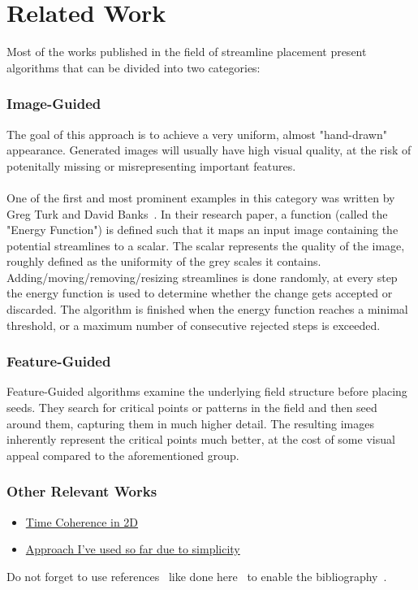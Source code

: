 \chapter{Related Work}
\label{sec:relatedWork}

Most of the works published in the field of streamline placement present algorithms that can be divided into two categories:
\subsection{Image-Guided}
The goal of this approach is to achieve a very uniform, almost "hand-drawn" appearance.
Generated images will usually have high visual quality, at the risk of potenitally missing or misrepresenting important features.
\\\\
One of the first and most prominent examples in this category was written by Greg Turk and David Banks~\cite{TurkBanks}.
In their research paper, a function (called the "Energy Function") is defined such that it maps an input image containing the potential streamlines to a scalar.
The scalar represents the quality of the image, roughly defined as the uniformity of the grey scales it contains. 
Adding/moving/removing/resizing streamlines is done randomly, at every step the energy function is used to determine whether the change gets accepted or discarded.
The algorithm is finished when the energy function reaches a minimal threshold, or a maximum number of consecutive rejected steps is exceeded.


\subsection{Feature-Guided}
Feature-Guided algorithms examine the underlying field structure before placing seeds.
They search for critical points or patterns in the field and then seed around them, capturing them in much higher detail.
The resulting images inherently represent the critical points much better, at the cost of some visual appeal compared to the aforementioned group.
\bigskip

\begin{center}
    
\end{center}


\subsection{Other Relevant Works}
\begin{itemize}
    \item \href{https://www.cs.purdue.edu/homes/xmt/papers/Coherent-Streamline_Tsinghua_2012.pdf}{Time Coherence in 2D}
    \item \href{https://www.cg.tuwien.ac.at/courses/Visualisierung1/2015W/exercises/Streamlines_Jobard&Lefer.pdf}{Approach I've used so far due to simplicity}
\end{itemize}

Do not forget to use references~\cite{Hanser2019energy} like done here~\cite{Hofmann2019dependentVectors} to enable the bibliography~\cite{Jung2017tumble, Sagrista2019GaiaSky, Sdeo2018fullerene, Zheng2019equivalence}.